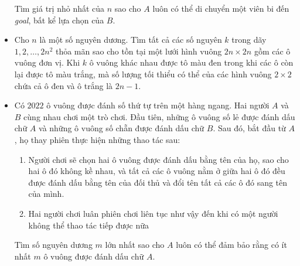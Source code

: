 \documentclass[11pt]{scrartcl}
\begin{document}
\begin{itemize}[label=, leftmargin=0em, itemsep=-0em]
\begin{btvn}
\begin{enumerate}
        \end{enumerate}
        
        Tìm giá trị nhỏ nhất của $n$ sao cho $A$ luôn có thể di chuyển một viên bi đến \textit{goal}, bất kể lựa chọn của $B$.
    \end{btvn}


    \item \begin{btvn}
        Cho $n$ là một số nguyên dương. Tìm tất cả các số nguyên $k$ trong dãy $1, 2, \dots, 2n^2$ thỏa mãn sao cho tồn tại một lưới hình vuông $2n \times 2n$ gồm các ô vuông đơn vị. Khi $k$ ô vuông khác nhau được tô màu đen trong khi các ô còn lại được tô màu trắng, mà số lượng tối thiểu có thể của các hình vuông $2 \times 2$ chứa cả ô đen và ô trắng là $2n - 1$.
    \end{btvn}

    \item \begin{btvn}
        Có $2022$ ô vuông được đánh số thứ tự trên một hàng ngang. Hai người $A$ và $B$ cùng nhau chơi một trò chơi. Đầu tiên, những ô vuông số lẻ được đánh dấu chữ $A$ và những ô vuông số chẵn được đánh dấu chữ $B$. Sau đó, bắt đầu từ $A$, họ thay phiên thực hiện những thao tác sau:
        \begin{enumerate}
            \item Người chơi sẽ chọn hai ô vuông được đánh dấu bằng tên của họ, sao cho hai ô đó không kề nhau, và tất cả các ô vuông nằm ở giữa hai ô đó đều được đánh dấu bằng tên của đối thủ và đổi tên tất cả các ô đó sang tên của mình.
            \item Hai người chơi luân phiên chơi liên tục như vậy đến khi có một người không thể thao tác tiếp được nữa
        \end{enumerate}
        Tìm số nguyên dương $m$ lớn nhất sao cho $A$ luôn có thể đảm bảo rằng có ít nhất $m$ ô vuông được đánh dấu chữ $A$.
    \end{btvn}

\end{itemize}
\end{document}
